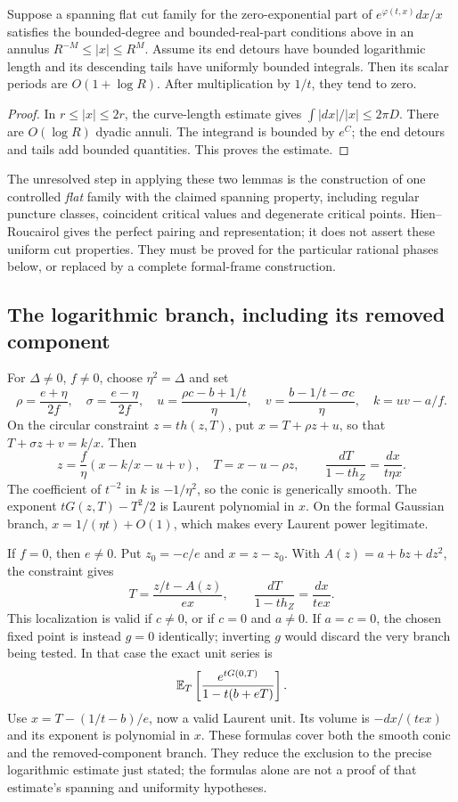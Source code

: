 \begin{lemma}\label{lem:conditionallog}
Suppose a spanning flat cut family for the zero-exponential part of
$e^{\varphi(t,x)}dx/x$ satisfies the bounded-degree and bounded-real-part
conditions above in an annulus $R^{-M}\leq|x|\leq R^M$. Assume its
end detours have bounded logarithmic length and its descending tails
have uniformly bounded integrals. Then its scalar periods are
$O(1+\log R)$. After multiplication by $1/t$, they tend to zero.
\end{lemma}
\begin{proof}
In $r\leq|x|\leq2r$, the curve-length estimate gives
$\int|dx|/|x|\leq2\pi D$. There are $O(\log R)$ dyadic annuli.
The integrand is bounded by $e^C$; the end detours and tails add
bounded quantities. This proves the estimate.
\end{proof}

The unresolved step in applying these two lemmas is the construction
of one controlled \emph{flat} family with the claimed spanning
property, including regular puncture classes, coincident critical
values and degenerate critical points. Hien--Roucairol gives the
perfect pairing and representation; it does not assert these uniform
cut properties. They must be proved for the particular rational
phases below, or replaced by a complete formal-frame construction.

\subsection{The logarithmic branch, including its removed component}

For $\Delta\ne0$, $f\ne0$, choose $\eta^2=\Delta$ and set
\[
 \rho=\frac{e+\eta}{2f},\quad \sigma=\frac{e-\eta}{2f},\quad
 u=\frac{\rho c-b+1/t}{\eta},\quad
 v=\frac{b-1/t-\sigma c}{\eta},\quad k=uv-a/f.
\]
On the circular constraint $z=th(z,T)$, put
$x=T+\rho z+u$, so that $T+\sigma z+v=k/x$. Then
\[
 z=\frac f\eta(x-k/x-u+v),\quad T=x-u-\rho z,
 \qquad
 \frac{dT}{1-th_Z}=\frac{dx}{t\eta x}.
\]
The coefficient of $t^{-2}$ in $k$ is $-1/\eta^2$, so the conic
is generically smooth. The exponent $tG(z,T)-T^2/2$ is Laurent
polynomial in $x$. On the formal Gaussian branch,
$x=1/(\eta t)+O(1)$, which makes every Laurent power legitimate.

If $f=0$, then $e\ne0$. Put $z_0=-c/e$ and $x=z-z_0$. With
$A(z)=a+bz+dz^2$, the constraint gives
\[
 T=\frac{z/t-A(z)}{ex},\qquad
 \frac{dT}{1-th_Z}=\frac{dx}{tex}.
\]
This localization is valid if $c\ne0$, or if $c=0$ and $a\ne0$.
If $a=c=0$, the chosen fixed point is instead $g=0$ identically;
inverting $g$ would discard the very branch being tested. In that
case the exact unit series is
\[
 \mathbb E_T\left[\frac{e^{tG(0,T)}}{1-t(b+eT)}\right].
\]
Use $x=T-(1/t-b)/e$, now a valid Laurent unit. Its volume is
$-dx/(tex)$ and its exponent is polynomial in $x$. These formulas
cover both the smooth conic and the removed-component branch.
They reduce the exclusion to the precise logarithmic estimate just
stated; the formulas alone are not a proof of that estimate's
spanning and uniformity hypotheses.

